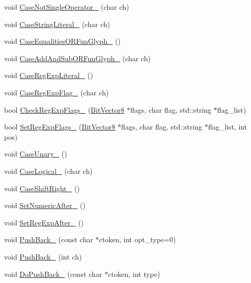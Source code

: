 \begin{DoxyCompactItemize}
\item 
void \hyperlink{classmocha_1_1_scanner_1_1_internal_scanner_ab6a036e3a80ccc3c8624700f165a27a0}{CaseNotSingleOperator\_\-} (char ch)
\item 
void \hyperlink{classmocha_1_1_scanner_1_1_internal_scanner_ad231b0f3375980c4404b7254ad2aa9a1}{CaseStringLiteral\_\-} (char ch)
\item 
void \hyperlink{classmocha_1_1_scanner_1_1_internal_scanner_ac4750f857c9104c44e87502b45f4ff5c}{CaseEqualitiesORFunGlyph\_\-} ()
\item 
void \hyperlink{classmocha_1_1_scanner_1_1_internal_scanner_ab8c3d5c1d22060a478c17e876d6d5194}{CaseAddAndSubORFunGlyph\_\-} (char ch)
\item 
void \hyperlink{classmocha_1_1_scanner_1_1_internal_scanner_afd4d2f3d560d83dd58f94abb546f37e9}{CaseRegExpLiteral\_\-} ()
\item 
void \hyperlink{classmocha_1_1_scanner_1_1_internal_scanner_a8635456a679ee2c15f702efc6375ca67}{CaseRegExpFlag\_\-} (char ch)
\item 
bool \hyperlink{classmocha_1_1_scanner_1_1_internal_scanner_a7f9b739e1726bdf85ab7a6228c4a3f9f}{CheckRegExpFlags\_\-} (\hyperlink{classmocha_1_1_bit_vector}{BitVector8} $\ast$flags, char flag, std::string $\ast$flag\_\-list)
\item 
bool \hyperlink{classmocha_1_1_scanner_1_1_internal_scanner_adcf232a9b6bef5ff66429d3fbd0228b1}{SetRegExpFlags\_\-} (\hyperlink{classmocha_1_1_bit_vector}{BitVector8} $\ast$flags, char flag, std::string $\ast$flag\_\-list, int pos)
\item 
void \hyperlink{classmocha_1_1_scanner_1_1_internal_scanner_ac79ee731a9113676669c4b8b606f79f4}{CaseUnary\_\-} ()
\item 
void \hyperlink{classmocha_1_1_scanner_1_1_internal_scanner_a82da9e01869185705be0883e87686ec0}{CaseLogical\_\-} (char ch)
\item 
void \hyperlink{classmocha_1_1_scanner_1_1_internal_scanner_aa1121988afcb4286eaaa52d0b5d2c523}{CaseShiftRight\_\-} ()
\item 
void \hyperlink{classmocha_1_1_scanner_1_1_internal_scanner_a69492606d5d7247794b2a2b18ec4bd6a}{SetNumericAfter\_\-} ()
\item 
void \hyperlink{classmocha_1_1_scanner_1_1_internal_scanner_ae31341bd6e88e1b38fdfc27721e4ba38}{SetRegExpAfter\_\-} ()
\item 
void \hyperlink{classmocha_1_1_scanner_1_1_internal_scanner_a3cbc3e83cc39aa11c2b71f55488baa4e}{PushBack\_\-} (const char $\ast$ctoken, int opt\_\-type=0)
\item 
void \hyperlink{classmocha_1_1_scanner_1_1_internal_scanner_aadc43017e2364c5850cf987aa47ece10}{PushBack\_\-} (int ch)
\item 
void \hyperlink{classmocha_1_1_scanner_1_1_internal_scanner_acf7422e4d6c7992b103c467882e3ba9f}{DoPushBack\_\-} (const char $\ast$ctoken, int type)
\end{DoxyCompactItemize}
